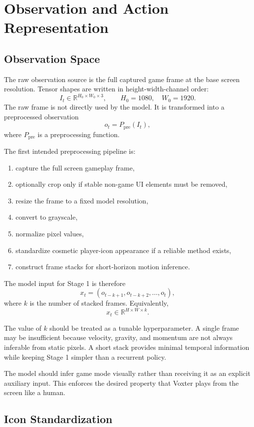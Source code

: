 \documentclass[11pt]{article}
\newcommand{\R}{\mathbb{R}}
\newcommand{\Ppre}{P_{\mathrm{pre}}}
\begin{document}
\section{Observation and Action Representation}

\subsection{Observation Space}

The raw observation source is the full captured game frame at the base screen resolution. Tensor shapes are written in height-width-channel order:
\[
  I_t \in \R^{H_0 \times W_0 \times 3},
  \qquad
  H_0 = 1080,\quad W_0 = 1920.
\]
The raw frame is not directly used by the model. It is transformed into a preprocessed observation
\[
  o_t = \Ppre(I_t),
\]
where \(\Ppre\) is a preprocessing function.

The first intended preprocessing pipeline is:
\begin{enumerate}
  \item capture the full screen gameplay frame,
  \item optionally crop only if stable non-game UI elements must be removed,
  \item resize the frame to a fixed model resolution,
  \item convert to grayscale,
  \item normalize pixel values,
  \item standardize cosmetic player-icon appearance if a reliable method exists,
  \item construct frame stacks for short-horizon motion inference.
\end{enumerate}

The model input for Stage 1 is therefore
\[
  x_t = (o_{t-k+1}, o_{t-k+2}, \ldots, o_t),
\]
where \(k\) is the number of stacked frames. Equivalently,
\[
  x_t \in \R^{H \times W \times k}.
\]

The value of \(k\) should be treated as a tunable hyperparameter. A single frame may be insufficient because velocity, gravity, and momentum are not always inferable from static pixels. A short stack provides minimal temporal information while keeping Stage 1 simpler than a recurrent policy.

The model should infer game mode visually rather than receiving it as an explicit auxiliary input. This enforces the desired property that Voxter plays from the screen like a human.

\subsection{Icon Standardization}
\end{document}
